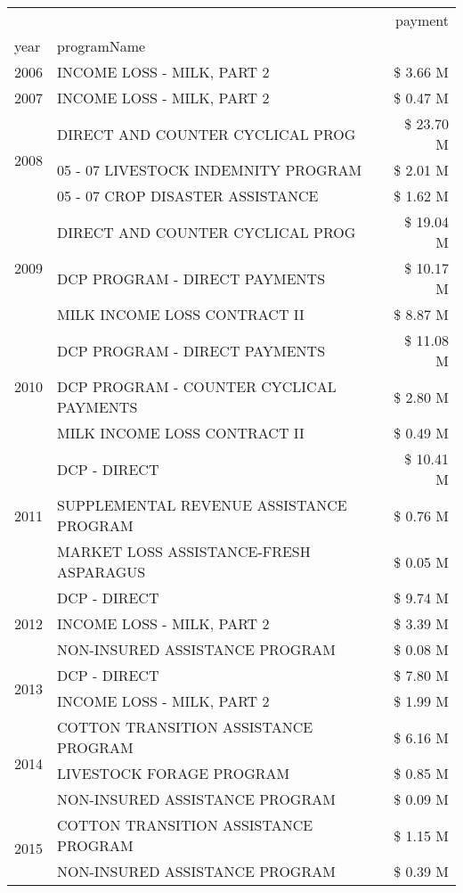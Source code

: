 \begin{tabular}{llr}
\toprule
 &  & payment \\
year & programName &  \\
\midrule
2006 & INCOME LOSS - MILK, PART 2 & \$ 3.66 M \\
\cline{1-3}
2007 & INCOME LOSS - MILK, PART 2 & \$ 0.47 M \\
\cline{1-3}
\multirow[t]{3}{*}{2008} & DIRECT AND COUNTER CYCLICAL PROG & \$ 23.70 M \\
 & 05 - 07 LIVESTOCK INDEMNITY PROGRAM & \$ 2.01 M \\
 & 05 - 07 CROP DISASTER ASSISTANCE & \$ 1.62 M \\
\cline{1-3}
\multirow[t]{3}{*}{2009} & DIRECT AND COUNTER CYCLICAL PROG & \$ 19.04 M \\
 & DCP PROGRAM - DIRECT PAYMENTS & \$ 10.17 M \\
 & MILK INCOME LOSS CONTRACT II & \$ 8.87 M \\
\cline{1-3}
\multirow[t]{3}{*}{2010} & DCP PROGRAM - DIRECT PAYMENTS & \$ 11.08 M \\
 & DCP PROGRAM - COUNTER CYCLICAL PAYMENTS & \$ 2.80 M \\
 & MILK INCOME LOSS CONTRACT II & \$ 0.49 M \\
\cline{1-3}
\multirow[t]{3}{*}{2011} & DCP - DIRECT & \$ 10.41 M \\
 & SUPPLEMENTAL REVENUE ASSISTANCE PROGRAM & \$ 0.76 M \\
 & MARKET LOSS ASSISTANCE-FRESH ASPARAGUS & \$ 0.05 M \\
\cline{1-3}
\multirow[t]{3}{*}{2012} & DCP - DIRECT & \$ 9.74 M \\
 & INCOME LOSS - MILK, PART 2 & \$ 3.39 M \\
 & NON-INSURED ASSISTANCE PROGRAM & \$ 0.08 M \\
\cline{1-3}
\multirow[t]{2}{*}{2013} & DCP - DIRECT & \$ 7.80 M \\
 & INCOME LOSS - MILK, PART 2 & \$ 1.99 M \\
\cline{1-3}
\multirow[t]{3}{*}{2014} & COTTON TRANSITION ASSISTANCE PROGRAM & \$ 6.16 M \\
 & LIVESTOCK FORAGE PROGRAM & \$ 0.85 M \\
 & NON-INSURED ASSISTANCE PROGRAM & \$ 0.09 M \\
\cline{1-3}
\multirow[t]{3}{*}{2015} & COTTON TRANSITION ASSISTANCE PROGRAM & \$ 1.15 M \\
 & NON-INSURED ASSISTANCE PROGRAM & \$ 0.39 M \\

\end{tabular}
